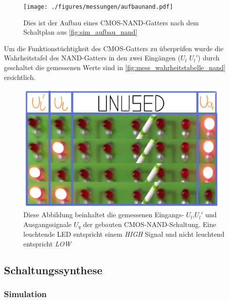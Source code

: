 \documentclass[12pt,english,ngerman]{scrartcl}
\begin{document}
\begin{figure}[H]
  \centering
    \texttt{[image: ./figures/messungen/aufbaunand.pdf]}
  \caption{Dies ist der Aufbau eines CMOS-NAND-Gatters nach dem Schaltplan aus
  \autoref{fig:sim_aufbau_nand}}
  \label{fig:mess_aufbau_nand}
\end{figure}

Um die Funktionstüchtigkeit des CMOS-Gatters zu überprüfen wurde die
Wahrheitstafel des NAND-Gatters in den zwei Eingängen ($U_l$ $U_l'$) durch
geschaltet die gemessenen Werte sind in \autoref{fig:mess_wahrheitstabelle_nand}
ersichtlich.


\begin{figure}[H]
  \centering
    \includegraphics[width=0.95\textwidth]{./figures/messungen/WahrheitstabelleNAND.pdf}
  \caption{Diese Abbildung beinhaltet die gemessenen Eingangs- $U_l$,$U_l'$ und
  Ausgangssignale $U_q$ der gebauten CMOS-NAND-Schaltung. Eine leuchtende
  LED entspricht einem \textit{HIGH} Signal und nicht leuchtend entspricht
  \textit{LOW}}
  \label{fig:mess_wahrheitstabelle_nand}
\end{figure}


\subsection{Schaltungssynthese}
\subsubsection{Simulation}

\end{document}
